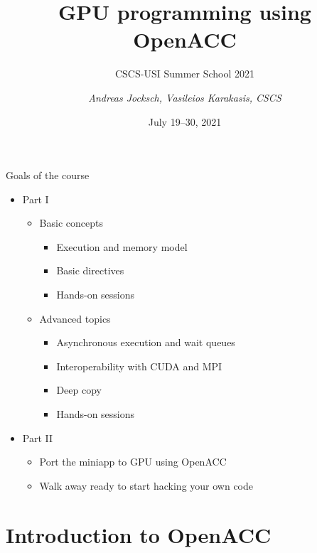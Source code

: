 \documentclass[12pt,aspectratio=169]{beamer}
\author{\emph{Andreas Jocksch, Vasileios Karakasis, CSCS}}
\title{GPU programming using OpenACC}
\subtitle{CSCS-USI Summer School 2021}
\date{July 19--30, 2021}
\begin{document}
\cscstitle

\begin{frame}{Goals of the course}
  \begin{itemize}
  \item Part I
    \begin{itemize}
    \item Basic concepts
      \begin{itemize}
      \item Execution and memory model
      \item Basic directives
      \item Hands-on sessions
      \end{itemize}
    \item Advanced topics
      \begin{itemize}
      \item Asynchronous execution and wait queues
      \item Interoperability with CUDA and MPI
      \item Deep copy
      \item Hands-on sessions
      \end{itemize}
    \end{itemize}
  \item  Part II
    \begin{itemize}
    \item Port the miniapp to GPU using OpenACC
    \item Walk away ready to start hacking your own code
    \end{itemize}
  \end{itemize}
\end{frame}

\part{Introduction to OpenACC}

\end{document}
